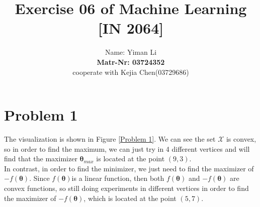 \documentclass{article}
\title{Exercise 06 of Machine Learning [IN 2064]}
\author{
  Name: Yiman Li \\
  \textbf{Matr-Nr: 03724352} \\
  cooperate with Kejia Chen(03729686)\\
}
\begin{document}
\maketitle

\section*{Problem 1}
The visualization is shown in Figure \ref{Problem 1}. We can see the set $\bm{\mathcal{X}}$ is convex, so in order to find the maximum, we can just try in 4 different vertices and will find that the maximizer $\bm{\theta}_{max}$ is located at the point $(9, 3)$.\\
In contrast, in order to find the minimizer, we just need to find the maximizer of $-f(\bm{\theta})$. Since $f(\bm{\theta})$is a linear function, then both $f(\bm{\theta})$ and $-f(\bm{\theta})$ are convex functions, so still doing experiments in different vertices in order to find the maximizer of $-f(\bm{\theta})$, which is located at the point $(5, 7)$.
\end{document}
